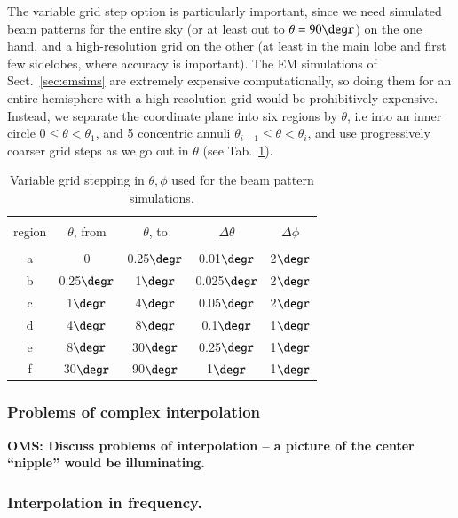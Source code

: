 \documentclass{aa}
\begin{document}
The variable grid step option is particularly important, since we need simulated beam patterns for the entire sky (or at least out to $\theta=90\degr$) on the one hand, and a high-resolution grid on the other (at least in the main lobe and first few sidelobes, where accuracy is important). The EM simulations of Sect.~\ref{sec:emsims} are extremely expensive computationally, so doing them for an entire hemisphere with a high-resolution grid would be prohibitively expensive. Instead, we separate the coordinate plane into six regions by $\theta$, i.e into an inner circle $0\leq\theta<\theta_1$, and 5 concentric annuli $\theta_{i-1}\leq\theta<\theta_i$, and use progressively coarser grid steps as we go out in $\theta$ (see Tab.~\ref{tab:grids}). 

\begin{table}
\begin{center}
  \begin{tabular}[]{ccccc}
  \hline
  \hline
  & & & &\\ [-1ex]
    region & $\theta$, from & $\theta$, to & $\Delta\theta$ & $\Delta\phi$ \\
  \hline
  & & & & \\ [-1ex]
    a & 0 & 0.25$\degr$ & 0.01$\degr$ & 2$\degr$ \\ 
    b & 0.25$\degr$ & 1$\degr$ & 0.025$\degr$ & 2$\degr$ \\ 
    c & 1$\degr$ & 4$\degr$ & 0.05$\degr$ & 2$\degr$ \\ 
    d & 4$\degr$ & 8$\degr$ & 0.1$\degr$ & 1$\degr$ \\ 
    e & 8$\degr$ & 30$\degr$ & 0.25$\degr$ & 1$\degr$ \\ 
    f & 30$\degr$ & 90$\degr$ & 1$\degr$ & 1$\degr$ \\ 
  \hline
  \end{tabular}
\end{center}
\caption{\label{tab:grids}Variable grid stepping in $\theta,\phi$ used for the beam pattern simulations.}
\end{table}


\subsubsection{Problems of complex interpolation} 

{\bf OMS: Discuss problems of interpolation -- a picture of the center ``nipple'' would be illuminating.}

\subsubsection{Interpolation in frequency.}
\end{document}
